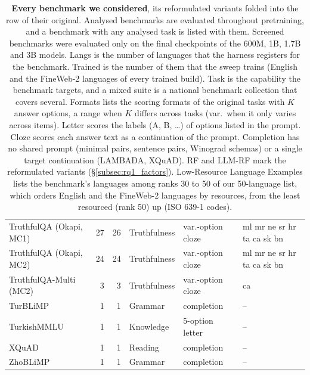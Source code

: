 \begin{table}[p]
\begin{tabular}{@{}lrrll>{\raggedright\arraybackslash}p{2.8cm}@{}}
TruthfulQA (Okapi, MC1) \citeneeded{} & 27 & 26 & Truthfulness & var.-option cloze & ml mr ne sr hr ta ca sk bn \\
TruthfulQA (Okapi, MC2) \citeneeded{} & 24 & 24 & Truthfulness & var.-option cloze & ml mr ne sr hr ta ca sk bn \\
TruthfulQA-Multi (MC2) \citeneeded{} & 3 & 3 & Truthfulness & var.-option cloze & ca \\
TurBLiMP \citeneeded{} & 1 & 1 & Grammar & completion & -- \\
TurkishMMLU \citeneeded{} & 1 & 1 & Knowledge & 5-option letter & -- \\
XQuAD \citeneeded{} & 1 & 1 & Reading & completion & -- \\
ZhoBLiMP \citeneeded{} & 1 & 1 & Grammar & completion & -- \\
\bottomrule
\end{tabular}
\caption{\textbf{Every benchmark we considered}, its reformulated variants folded into the row of their original. Analysed benchmarks are evaluated throughout pretraining, and a benchmark with any analysed task is listed with them. Screened benchmarks were evaluated only on the final checkpoints of the 600M, 1B, 1.7B and 3B models. Langs is the number of languages that the harness registers for the benchmark. Trained is the number of them that the sweep trains (English and the FineWeb-2 languages of every trained build). Task is the capability the benchmark targets, and a mixed suite is a national benchmark collection that covers several. Formats lists the scoring formats of the original tasks with $K$ answer options, a range when $K$ differs across tasks (var.\ when it only varies across items). Letter scores the labels (A, B, \ldots) of options listed in the prompt. Cloze scores each answer text as a continuation of the prompt. Completion has no shared prompt (minimal pairs, sentence pairs, Winograd schemas) or a single target continuation (LAMBADA, XQuAD). RF and LLM-RF mark the reformulated variants (\S\ref{subsec:rq1_factors}). Low-Resource Language Examples lists the benchmark's languages among ranks 30 to 50 of our 50-language list, which orders English and the FineWeb-2 languages by resources, from the least resourced (rank 50) up (ISO 639-1 codes).}
\label{tab:app_benchmarks_considered}
\end{table}
